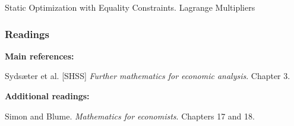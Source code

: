 \documentclass[10pt]{beamer}
\theoremstyle{definition}
\begin{document}
\begin{section}{Static Optimization with Equality Constraints. Lagrange Multipliers}
%

\end{section}

\begin{frame}[fragile]
\frametitle{Readings}
\textbf{Main references:}

Syds\ae{}ter et al. [SHSS] \emph{Further mathematics for economic analysis}. Chapter 3.\bigskip

\textbf{Additional readings:}

Simon and Blume. \emph{Mathematics for economists}. Chapters 17 and 18.
\end{frame}
\end{document}
